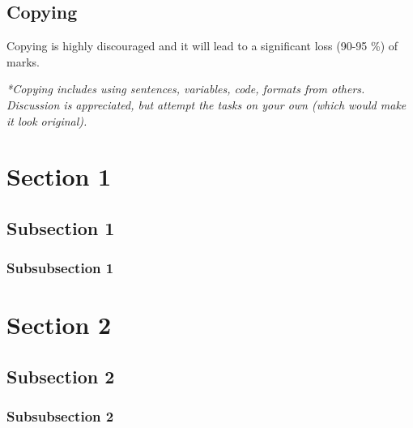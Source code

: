 \documentclass[11pt,a4paper]{article}
\begin{document}
\subsection*{Copying}
Copying is highly discouraged and it will lead to a significant loss  (90-95 \%) of marks.

\textit{*Copying includes using sentences, variables, code, formats from others. Discussion is appreciated, but attempt the tasks on your own (which would make it look original).}

\newpage
\section{Section 1}
\subsection{Subsection 1}
\subsubsection{Subsubsection 1}

\newpage
\section{Section 2}
\subsection{Subsection 2}
\subsubsection{Subsubsection 2}
\end{document}
